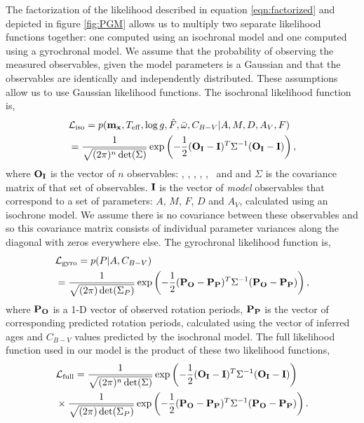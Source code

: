 The factorization of the likelihood described in equation \ref{eqn:factorized}
and depicted in figure \ref{fig:PGM} allows us to multiply two separate
likelihood functions together: one computed using an isochronal model and one
computed using a gyrochronal model.
We assume that the probability of observing the measured observables, given
the model parameters is a Gaussian and that the observables are identically
and independently distributed.
These assumptions allow us to use Gaussian likelihood functions.
The isochronal likelihood function is,
\begin{eqnarray}
    & \mathcal{L_{\mathrm{iso}}} = p({\bf m_x}, T_{\mathrm{eff}}, \log g, \hat{F},
    \bar{\omega}, C_{B-V}|A, M, D,
    A_V, F) \\ \nonumber
    & = \frac{1}{\sqrt{(2\pi)^n \det(\Sigma)}}
    \exp\left( -\frac{1}{2} ({\bf O_I} - {\bf I})^T \Sigma ^{-1}
    ({\bf O_I} - {\bf I})\right),
\label{eqn:iso_likelihood}
\end{eqnarray}
where ${\bf O_I}$ is the vector of $n$ observables: \teff, \logg, \fhat,
\pmega, \mj, \mh\ and \mk and $\Sigma$ is the covariance matrix of that set of
observables.
${\bf I}$ is the vector of {\it model} observables that correspond to a set of
parameters: $A$, $M$, $F$, $D$ and $A_V$, calculated using an isochrone model.
We assume there is no covariance between these observables and so this
covariance matrix consists of individual parameter variances along the
diagonal with zeros everywhere else.
The gyrochronal likelihood function is,
\begin{eqnarray}
    & \mathcal{L_{\mathrm{gyro}}} = p(P |A, C_{B-V}) \\ \nonumber
    & = \frac{1}{\sqrt{(2\pi) \det(\Sigma_P)}}
    \exp\left( -\frac{1}{2} ({\bf P_O} - {\bf P_P})^T \Sigma ^{-1}
    ({\bf P_O} - {\bf P_P})\right),
\label{eqn:gyro_likelihood}
\end{eqnarray}
where ${\bf P_O}$ is a 1-D vector of observed rotation periods, ${\bf P_P}$ is
the vector of corresponding predicted rotation periods, calculated using the
vector of inferred ages and $C_{B-V}$ values predicted by the isochronal
model.
The full likelihood function used in our model is the product of these two
likelihood functions,
\begin{eqnarray}
    & \mathcal{L_{\mathrm{full}}} = \frac{1}{\sqrt{(2\pi)^n \det(\Sigma)}}
    \exp\left( -\frac{1}{2} ({\bf O_I} - {\bf I})^T \Sigma ^{-1}
    ({\bf O_I} - {\bf I})\right) \\ \nonumber
    & \times
    \frac{1}{\sqrt{(2\pi) \det(\Sigma_P)}}
    \exp\left( -\frac{1}{2} ({\bf P_O} - {\bf P_P})^T \Sigma ^{-1}
    ({\bf P_O} - {\bf P_P})\right).
\label{eqn:full_likelihood}
\end{eqnarray}

